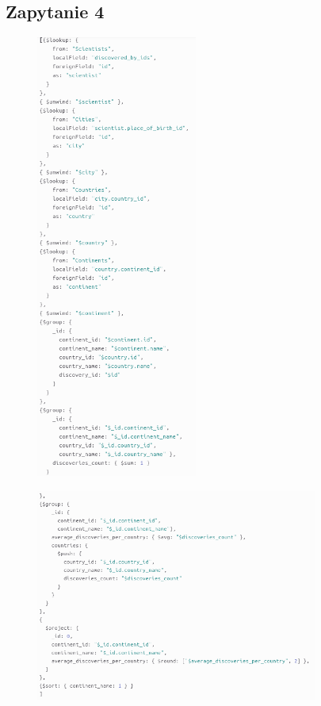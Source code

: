 \documentclass[11pt]{article}
\begin{document}
	\subsection{Zapytanie 4}
		\begin{figure}[!ht]
			\begin{center}
				\includegraphics[width=200px]{m4_1.png}
			\end{center}
		\end{figure}

\newpage
		\begin{figure}[!ht]
			\begin{center}
				\includegraphics[width=350px]{m4_2.png}
			\end{center}
		\end{figure}
\end{document}
